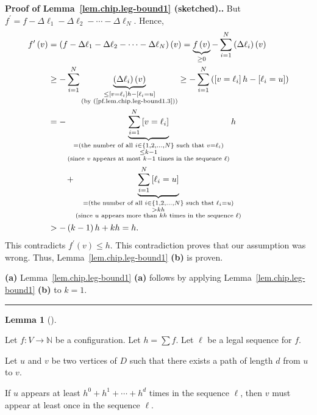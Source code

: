 \documentclass[numbers=enddot,12pt,final,onecolumn,notitlepage]{scrartcl}%
\theoremstyle{definition}
\newtheorem{lem}[theo]{Lemma}
\newenvironment{lemma}[1][]
{\begin{lem}[#1]\begin{leftbar}}
{\end{leftbar}\end{lem}}
\newenvironment{proof}[1][Proof]{\noindent\textbf{#1.} }{\ \rule{0.5em}{0.5em}}
\let\sumnonlimits\sum
\renewcommand{\sum}{\sumnonlimits\limits}
\newcommand{\NN}{\mathbb{N}}
\begin{document}
\begin{proof}[Proof of Lemma~\ref{lem.chip.leg-bound1} (sketched).]
But $f^{\prime}=f-\Delta\ell_{1}-\Delta\ell_{2}-\cdots-\Delta\ell_{N}$.
Hence,
\begin{align*}
f^{\prime}\left(  v\right)   &  =\left(  f-\Delta\ell_{1}-\Delta\ell
_{2}-\cdots-\Delta\ell_{N}\right)  \left(  v\right)  =\underbrace{f\left(
v\right)  }_{\geq0}-\sum_{i=1}^{N}\left(  \Delta\ell_{i}\right)  \left(
v\right) \\
&\geq -\sum_{i=1}^{N}\underbrace{\left(  \Delta\ell_{i}\right)  \left(
v\right)  }_{\substack{\leq\left[  v=\ell_{i}\right]  h-\left[  \ell
_{i}=u\right]  \\\text{(by (\ref{pf.lem.chip.leg-bound1.3}))}}}
 \geq -\sum_{i=1}^{N}\left(  \left[  v=\ell_{i}\right]  h-\left[  \ell
_{i}=u\right]  \right)  \\
&  =-\underbrace{\sum_{i=1}^{N}\left[  v=\ell_{i}\right]  }%
_{\substack{=\left(  \text{the number of all }i\in\left\{  1,2,\ldots
,N\right\}  \text{ such that }v=\ell_{i}\right)  \\\leq k-1\\\text{(since
}v\text{ appears at most }k-1\text{ times in the sequence }\ell\text{)}}}h\\
&  \qquad +\underbrace{\sum_{i=1}^{N}\left[  \ell_{i}=u\right]
}_{\substack{=\left(  \text{the number of all }i\in\left\{  1,2,\ldots
,N\right\}  \text{ such that }\ell_{i}=u\right)  \\>kh\\\text{(since }u\text{
appears more than }kh\text{ times in the sequence }\ell\text{)}}}\\
&  >-\left(  k-1\right)  h+kh=h.
\end{align*}
This contradicts $f^{\prime}\left(  v\right)  \leq h$. This contradiction
proves that our assumption was wrong. Thus, Lemma~\ref{lem.chip.leg-bound1}
\textbf{(b)} is proven.

\textbf{(a)} Lemma~\ref{lem.chip.leg-bound1} \textbf{(a)} follows by applying
Lemma~\ref{lem.chip.leg-bound1} \textbf{(b)} to $k=1$.
\end{proof}

\begin{lemma} \label{lem.chip.leg-bound1b}
Let $f : V \to \NN$ be a configuration.
Let $h = \sum f$.
Let $\ell$ be a legal sequence for $f$.

Let $u$ and $v$ be two vertices of $D$ such that there exists
a path of length $d$ from $u$ to $v$.

If $u$ appears at least $h^0 + h^1 + \cdots + h^d$
times in the sequence $\ell$,
then $v$ must appear at least once in the sequence $\ell$.
\end{lemma}
\end{document}
